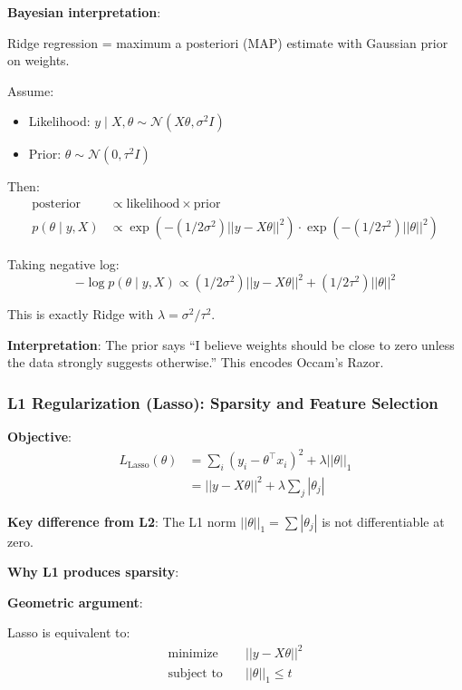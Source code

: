 \textbf{Bayesian interpretation}:

Ridge regression = maximum a posteriori (MAP) estimate with Gaussian prior on weights.

Assume:
\begin{itemize}
    \item Likelihood: $y \mid X, \theta \sim \mathcal{N}(X\theta, \sigma^2 I)$
    \item Prior: $\theta \sim \mathcal{N}(0, \tau^2 I)$
\end{itemize}

Then:
\begin{align}
\text{posterior} &\propto \text{likelihood} \times \text{prior} \\
p(\theta \mid y, X) &\propto \exp(-(1/2\sigma^2)||y - X\theta||^2) \cdot \exp(-(1/2\tau^2)||\theta||^2)
\end{align}

Taking negative log:
\begin{equation}
-\log p(\theta \mid y, X) \propto (1/2\sigma^2)||y - X\theta||^2 + (1/2\tau^2)||\theta||^2
\end{equation}

This is exactly Ridge with $\lambda = \sigma^2/\tau^2$.

\textbf{Interpretation}: The prior says ``I believe weights should be close to zero unless the data strongly suggests otherwise.'' This encodes Occam's Razor.

\subsubsection{L1 Regularization (Lasso): Sparsity and Feature Selection}

\textbf{Objective}:
\begin{align}
L_{\text{Lasso}}(\theta) &= \sum_{i} (y_i - \theta^\top x_i)^2 + \lambda||\theta||_1 \\
&= ||y - X\theta||^2 + \lambda\sum_{j} |\theta_j|
\end{align}

\textbf{Key difference from L2}: The L1 norm $||\theta||_1 = \sum|\theta_j|$ is not differentiable at zero.

\textbf{Why L1 produces sparsity}:

\textbf{Geometric argument}:

Lasso is equivalent to:
\begin{align}
\text{minimize} \quad & ||y - X\theta||^2 \\
\text{subject to} \quad & ||\theta||_1 \leq t
\end{align}

